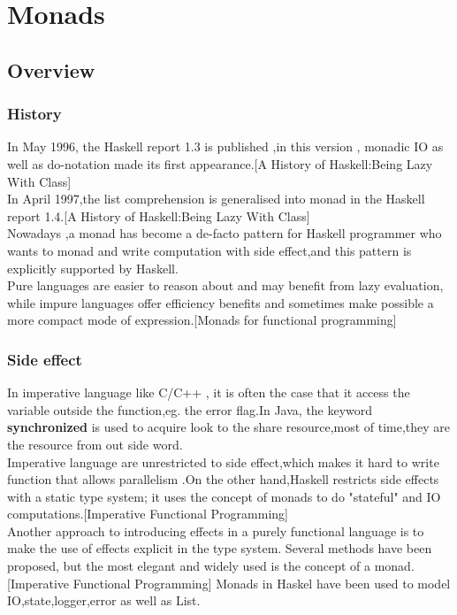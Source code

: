 \chapter{Monads}
\section{Overview}


\subsection{History}
In May 1996, the Haskell report 1.3 is published ,in this version , monadic IO as well as do-notation made its first appearance.[A History of Haskell:Being Lazy With Class] \\

In April 1997,the list comprehension is generalised into monad in the Haskell report 1.4.[A History of Haskell:Being Lazy With Class]\\ 

Nowadays ,a monad has become a de-facto pattern for Haskell programmer who wants to monad and write computation with side effect,and this pattern is explicitly supported by Haskell.\\


Pure languages are easier to reason about and may benefit from lazy
evaluation, while impure languages offer efficiency benefits and sometimes make possible a more compact mode of expression.[Monads for functional programming]



\subsection{Side effect}
In imperative language like C/C++ , it is often the case that it access the variable outside the function,eg. the error flag.In Java, the keyword \textbf{synchronized} is used to acquire look to the share resource,most of time,they are the resource from out side word.\\

Imperative language are unrestricted to side effect,which makes it hard to write function that allows parallelism .On the other hand,Haskell restricts side effects with a static type system; it uses the concept of monads to do "stateful" and IO computations.[Imperative Functional Programming]\\

Another approach to introducing effects in a purely functional language
is to make the use of effects explicit in the type system. Several methods
have been proposed, but the most elegant and widely used is the concept
of a monad.[Imperative Functional Programming]  Monads in Haskel have been used to model IO,state,logger,error as well as List.



